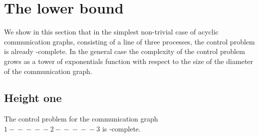\documentclass{llncs}
\newcommand{\edge}{-\!\!\!-\!\!\!-\!\!\!-\!\!\!-}
\begin{document}
\section{The lower bound}

We show in this section that in the simplest non-trivial case of
acyclic communication graphs, consisting of a line of three processes,
the control problem is already \EXPTIME-complete. In the general case
the complexity of the control problem grows as a tower of exponentials
function with respect to the size of the diameter of the communication
graph. 


\subsection{Height one}
\begin{proposition} \label{p:3} 
  The control problem for the communication graph $1 \edge 2 \edge 3$ is
  \EXPTIME-complete.
\end{proposition}

\medskip
\end{document}
